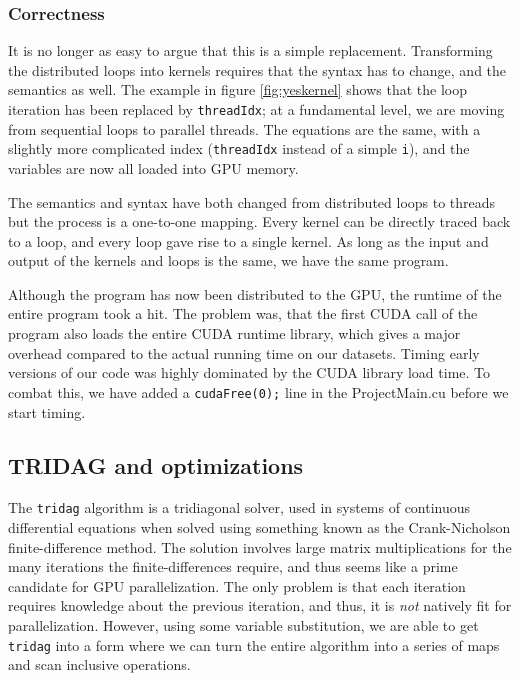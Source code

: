 \documentclass[12pt, oneside]{article}
\begin{document}
\subsubsection{Correctness}
It is no longer as easy to argue that this is a simple replacement. Transforming the distributed loops into kernels requires that the syntax has to change, and the semantics as well. The example in figure \ref{fig:yeskernel} shows that the loop iteration has been replaced by \texttt{threadIdx}; at a fundamental level, we are moving from sequential loops to parallel threads. The equations are the same, with a slightly more complicated index (\texttt{threadIdx} instead of a simple \texttt{i}), and the variables are now all loaded into GPU memory.
						
The semantics and syntax have both changed from distributed loops to threads but the process is a one-to-one mapping. Every kernel can be directly traced back to a loop, and every loop gave rise to a single kernel. As long as the input and output of the kernels and loops is the same, we have the same program.
						
Although the program has now been distributed to the GPU, the runtime of the entire program took a hit. The problem was, that the first CUDA call of the program also loads the entire CUDA runtime library, which gives a major overhead compared to the actual running time on our datasets. Timing early versions of our code was highly dominated by the CUDA library load time. To combat this, we have added a \texttt{cudaFree(0);} line in the ProjectMain.cu before we start timing.
\subsection{TRIDAG and optimizations}
The \texttt{tridag} algorithm is a tridiagonal solver, used in systems of continuous differential equations when solved using something known as the Crank-Nicholson finite-difference method. The solution involves large matrix multiplications for the many iterations the finite-differences require, and thus seems like a prime candidate for GPU parallelization. The only problem is that each iteration requires knowledge about the previous iteration, and thus, it is \emph{not} natively fit for parallelization. However, using some variable substitution, we are able to get \texttt{tridag} into a form where we can turn the entire algorithm into a series of maps and scan inclusive operations.
\end{document}
